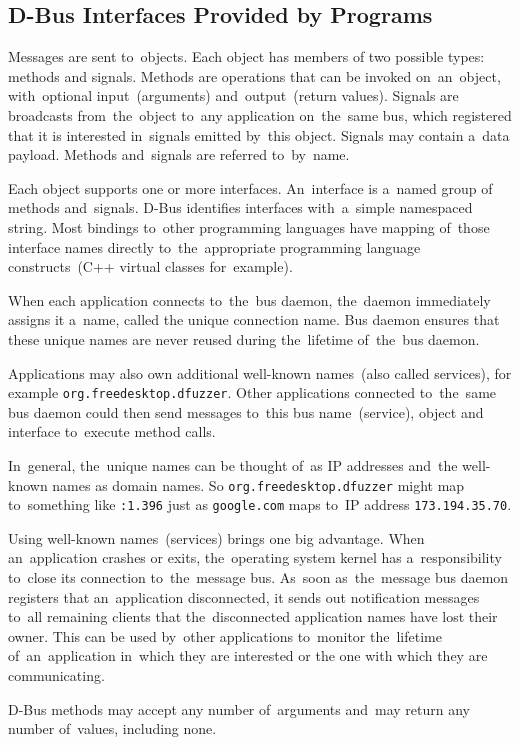 \documentclass[conference]{IEEEtran}
\begin{document}
\subsection{D-Bus Interfaces Provided by Programs}
Messages are sent to~objects. Each object has members of two possible types:
methods and signals.  Methods are operations that can be invoked on~an~object,
with~optional input~(arguments) and~output~(return values).  Signals are
broadcasts from~the~object to~any application on~the~same bus, which registered
that it is interested in~signals emitted by~this object. Signals may contain
a~data payload. Methods and~signals are referred to~by~name.


Each object supports one or more interfaces. An~interface is a~named group
of methods and~signals. D-Bus identifies interfaces with~a~simple namespaced string.
Most bindings to~other programming languages have mapping of~those interface names
directly to~the~appropriate programming language constructs~(C++ virtual classes
for~example).


When each application connects to~the~bus daemon, the~daemon immediately
assigns it a~name, called the unique connection name. Bus daemon ensures that
these unique names are never reused during the~lifetime of~the~bus daemon.


Applications may also own additional well-known names~(also called services),
for example \texttt{org.freedesktop.dfuzzer}. Other applications connected
to~the~same bus daemon could then send messages to~this bus name~(service),
object and interface to~execute method calls.


In~general, the~unique names can be thought of~as IP addresses and~the well-known
names as domain names. So \texttt{org.freedesktop.dfuzzer} might map to~something
like \texttt{:1.396} just as \texttt{google.com} maps to~IP address
\texttt{173.194.35.70}.


Using well-known names~(services) brings one big advantage. When an~application
crashes or exits, the~operating system kernel has a~responsibility to~close
its connection to~the~message bus. As~soon as~the~message bus daemon registers
that an~application disconnected, it sends out notification messages to~all
remaining clients that the~disconnected application names have lost their owner.
This can be used by~other applications to~monitor the~lifetime of~an~application
in~which they are interested or the one with which they are
communicating.

D-Bus methods may accept any number of~arguments and~may return any number
of~values, including none.
\end{document}
